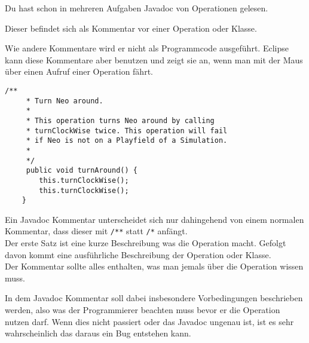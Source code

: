 \begin{Infobox}[Javadoc]
    Du hast schon in mehreren Aufgaben Javadoc von Operationen gelesen.

    Dieser befindet sich als Kommentar vor einer Operation oder Klasse.

    Wie andere Kommentare wird er nicht als Programmcode ausgeführt.
    Eclipse kann diese Kommentare aber benutzen und zeigt sie an, wenn man mit der Maus über einen Aufruf einer Operation fährt.

    \begin{lstlisting}[numbers=none]
    /**
     * Turn Neo around.
     *
     * This operation turns Neo around by calling
     * turnClockWise twice. This operation will fail 
     * if Neo is not on a Playfield of a Simulation.
     *
     */
     public void turnAround() {
        this.turnClockWise();
        this.turnClockWise();
    }
    \end{lstlisting}

    Ein Javadoc Kommentar unterscheidet sich nur dahingehend von einem normalen Kommentar, dass dieser mit \lstinline{/**} statt \lstinline{/*} anfängt.\\
    
    Der erste Satz ist eine kurze Beschreibung was die Operation macht.
    Gefolgt davon kommt eine ausführliche Beschreibung der Operation oder Klasse.\\

    Der Kommentar sollte alles enthalten, was man jemals über die Operation wissen muss.

    In dem Javadoc Kommentar soll dabei insbesondere Vorbedingungen beschrieben werden, also was der Programmierer beachten muss bevor er die Operation nutzen darf.
    Wenn dies nicht passiert oder das Javadoc ungenau ist, ist es sehr wahrscheinlich das daraus ein Bug entstehen kann.

\end{Infobox}


